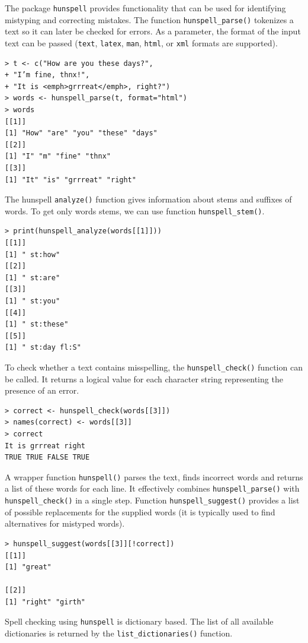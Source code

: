 The package \texttt{hunspell} provides functionality that can be used for identifying 
mistyping and correcting mistakes. The function \texttt{hunspell\_parse()} 
tokenizes a text so it can later be checked for errors. As a parameter, the format 
of the input text can be passed (\texttt{text}, \texttt{latex}, \texttt{man}, 
\texttt{html}, or \texttt{xml} formats are supported).

\begin{verbatim}
> t <- c("How are you these days?",
+ "I’m fine, thnx!",
+ "It is <emph>grrreat</emph>, right?")
> words <- hunspell_parse(t, format="html")
> words
[[1]]
[1] "How" "are" "you" "these" "days"
[[2]]
[1] "I" "m" "fine" "thnx"
[[3]]
[1] "It" "is" "grrreat" "right"
\end{verbatim}

The hunspell \texttt{analyze()} function gives information about stems and suffixes of words. To get only words stems, we can use function \texttt{hunspell\_stem()}.

\begin{verbatim}
> print(hunspell_analyze(words[[1]]))
[[1]]
[1] " st:how"
[[2]]
[1] " st:are"
[[3]]
[1] " st:you"
[[4]]
[1] " st:these"
[[5]]
[1] " st:day fl:S"
\end{verbatim}

To check whether a text contains misspelling, the \texttt{hunspell\_check()} function can be called. It returns a logical value for each character string representing
the presence of an error.

\begin{verbatim}
> correct <- hunspell_check(words[[3]])
> names(correct) <- words[[3]]
> correct
It is grrreat right
TRUE TRUE FALSE TRUE
\end{verbatim}

A wrapper function \texttt{hunspell()} parses the text, finds incorrect words
and returns a list of these words for each line. It effectively combines
\texttt{hunspell\_parse()} with \texttt{hunspell\_check()} in a single step.
Function \texttt{hunspell\_suggest()} provides a list of possible replacements for
the supplied words (it is typically used to find alternatives for mistyped words).

\begin{verbatim}
> hunspell_suggest(words[[3]][!correct])
[[1]]
[1] "great"

[[2]]
[1] "right" "girth"
\end{verbatim}

Spell checking using \texttt{hunspell} is dictionary based. The list of all available
dictionaries is returned by the \texttt{list\_dictionaries()} function.

